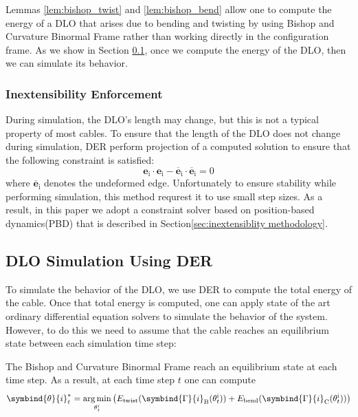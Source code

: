 Lemmas \ref{lem:bishop_twist} and \ref{lem:bishop_bend} allow one to compute the energy of a DLO that arises due to bending and twisting by using Bishop and Curvature Binormal Frame rather than working directly in the configuration frame. 
As we show in Section \ref{sec:integration}, once we compute the energy of the DLO, then we can simulate its behavior.

\subsubsection{Inextensibility Enforcement}
During simulation, the DLO's length may change, but this is not a typical property of most cables.
To ensure that the length of the DLO does not change during simulation, DER perform projection of a computed solution to ensure that the following constraint is satisfied:
\begin{equation}
    \textbf{e}_\text{i} \cdot \textbf{e}_\text{i} - \overline{\textbf{e}}_\text{i}\cdot\overline{\textbf{e}}_\text{i} = 0
\label{eq:inextensibility}
\end{equation}
where $\overline{\textbf{e}}_\text{i}$ denotes the undeformed edge. 
Unfortunately to ensure stability while performing simulation, this method requrest it to use small step sizes. 
As a result, in this paper we adopt a constraint solver based on position-based dynamics(PBD) \cite{PBD} that is described in Section\ref{sec:inextensiblity methodology}. 

\subsection{DLO Simulation Using DER}
\label{sec:integration}

To simulate the behavior of the DLO, we use DER to compute the total energy of the cable. 
Once that total energy is computed, one can apply state of the art ordinary differential equation solvers to simulate the behavior of the system.
However, to do this we need to assume that the cable reaches an equilibrium state between each simulation time step:
\begin{assum}
    The Bishop and Curvature Binormal Frame reach an equilibrium state at each time step. 
    As a result, at each time step $t$ one can compute 
    \begin{equation}
        \symbind{\theta}{i}^*_t = \underset{\theta^i_t}{\arg\min} \left(E_\text{twist}(\symbind{\Gamma}{i}_\text{B}(\theta^\text{i}_t)) + E_\text{bend}(\symbind{\Gamma}{i}_\text{C}(\theta^\text{i}_t)) \right)
        \label{eq:opt_theta}
    \end{equation}
\end{assum}

